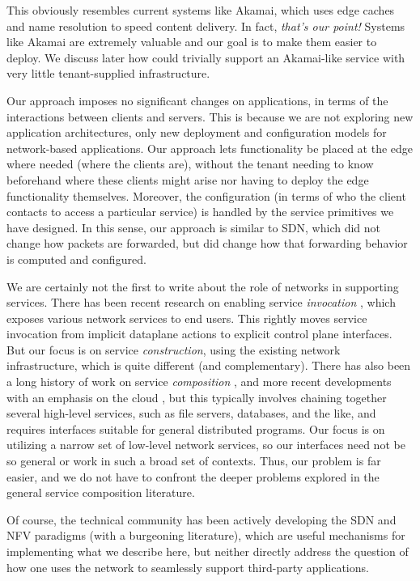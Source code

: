 This obviously resembles current systems like Akamai, which uses edge caches and name resolution to speed content delivery. In fact, {\em that's our point!} Systems like Akamai are extremely valuable and our goal is to make them easier to deploy. We discuss later how \name could trivially support an Akamai-like service with very little tenant-supplied infrastructure.

Our approach imposes no significant changes on applications, in terms of the interactions between clients and servers. This is because we are not exploring new application architectures, only new deployment and configuration models for network-based applications. Our approach lets functionality be placed at the edge where needed (\ie where the clients are), without the tenant needing to know beforehand where these clients might arise nor having to deploy the edge functionality themselves. Moreover, the configuration (in terms of who the client contacts to access a particular service) is handled by the service primitives we have designed. In this sense, our approach is similar to SDN, which did not change how packets are forwarded, but did change how that forwarding behavior is computed and configured.

We are certainly not the first to write about the role of networks in supporting services. There has been recent research on enabling service {\em invocation} \cite{netcall}, which exposes various network services to end users. This rightly moves service invocation from implicit dataplane actions to explicit control plane interfaces. But our focus is on service {\em construction}, using the existing network infrastructure, which is quite different (and complementary). There has also been a long history of work on service {\em composition} \cite{samimi2008dynamis, oppenheimer2006service}, and more recent developments with an emphasis on the cloud \cite{larry}, but this typically involves chaining together several high-level services, such as file servers, databases, and the like, and requires interfaces suitable for general distributed programs. Our focus is on utilizing a narrow set of low-level network services, so our interfaces need not be so general or work in such a broad set of contexts.  Thus, our problem is far easier, and we do not have to confront the deeper problems explored in the general service composition literature.

Of course, the technical community has been actively developing the SDN and NFV paradigms (with a burgeoning literature), which are useful mechanisms for implementing what we describe here, but neither directly address the question of how one uses the network to seamlessly support third-party applications.

